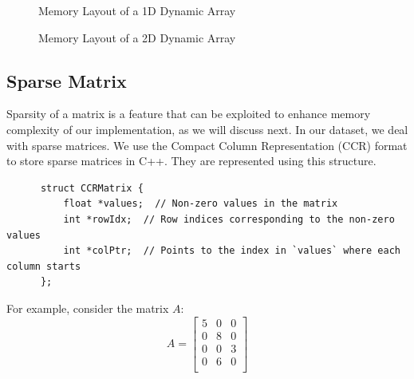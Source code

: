 \begin{figure}[h]
    \centering
    \caption{Memory Layout of a 1D Dynamic Array}
\end{figure}

\begin{figure}[h]
    \centering
    \caption{Memory Layout of a 2D Dynamic Array}
\end{figure}


\subsection{Sparse Matrix}\label{subsubsection:sparse-matrix}
Sparsity of a matrix is a feature that can be exploited to
enhance memory complexity of our implementation, as we will discuss next.
In our dataset, we deal with sparse matrices.
We use the Compact Column Representation (CCR) format to store sparse matrices in C++. They are represented using this
structure.

\begin{verbatim}
      struct CCRMatrix {
          float *values;  // Non-zero values in the matrix
          int *rowIdx;  // Row indices corresponding to the non-zero values
          int *colPtr;  // Points to the index in `values` where each column starts
      };
\end{verbatim}

For example, consider the matrix \( A \):
\[
    A =
    \begin{bmatrix}
        5 & 0 & 0 \\
        0 & 8 & 0 \\
        0 & 0 & 3 \\
        0 & 6 & 0 \\
    \end{bmatrix}
\]

